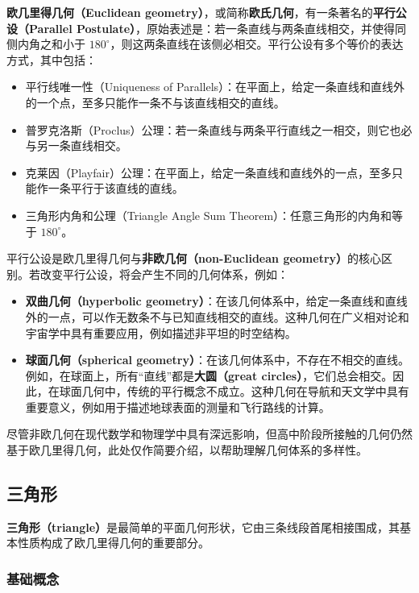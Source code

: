 \textbf{欧几里得几何（Euclidean geometry）}，或简称\textbf{欧氏几何}，有一条著名的\textbf{平行公设（Parallel Postulate）}，原始表述是：若一条直线与两条直线相交，并使得同侧内角之和小于 $180^\circ$，则这两条直线在该侧必相交。平行公设有多个等价的表达方式，其中包括：
\begin{itemize}
\item 平行线唯一性（Uniqueness of Parallels）：在平面上，给定一条直线和直线外的一个点，至多只能作一条不与该直线相交的直线。
\item 普罗克洛斯（Proclus）公理：若一条直线与两条平行直线之一相交，则它也必与另一条直线相交。
\item 克莱因（Playfair）公理：在平面上，给定一条直线和直线外的一点，至多只能作一条平行于该直线的直线。
\item 三角形内角和公理（Triangle Angle Sum Theorem）：任意三角形的内角和等于 $180^\circ$。
\end{itemize}

平行公设是欧几里得几何与\textbf{非欧几何（non-Euclidean geometry）}的核心区别。若改变平行公设，将会产生不同的几何体系，例如：

\begin{itemize}
\item \textbf{双曲几何（hyperbolic geometry）}：在该几何体系中，给定一条直线和直线外的一点，可以作无数条不与已知直线相交的直线。这种几何在广义相对论和宇宙学中具有重要应用，例如描述非平坦的时空结构。
\item \textbf{球面几何（spherical geometry）}：在该几何体系中，不存在不相交的直线。例如，在球面上，所有“直线”都是\textbf{大圆（great circles）}，它们总会相交。因此，在球面几何中，传统的平行概念不成立。这种几何在导航和天文学中具有重要意义，例如用于描述地球表面的测量和飞行路线的计算。
\end{itemize}

尽管非欧几何在现代数学和物理学中具有深远影响，但高中阶段所接触的几何仍然基于欧几里得几何，此处仅作简要介绍，以帮助理解几何体系的多样性。

\subsection{三角形}

\textbf{三角形（triangle）}是最简单的平面几何形状，它由三条线段首尾相接围成，其基本性质构成了欧几里得几何的重要部分。

\subsubsection{基础概念}

